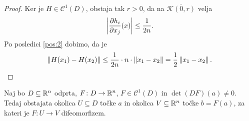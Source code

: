 \begin{proof}
Ker je $H \in \mathcal{C}^1(D)$, obstaja tak $r > 0$, da na
$\overline{\mathcal{K}(0,r)}$ velja
\[
\left\lvert \frac{\partial h_i}{\partial x_j}(x)\right\rvert \leq \frac{1}{2n}.
\]
Po posledici \ref{pos:2} dobimo, da je
\[
\left\lVert H(x_1) - H(x_2)\right\rVert \leq
\frac{1}{2n} \cdot n \cdot \left\lVert x_1 - x_2\right\rVert =
\frac{1}{2} \left\lVert x_1 - x_2\right\rVert. \qedhere
\]
\end{proof}

\begin{izrek}
\label{iz:inv}
Naj bo $D \subseteq \mathbb{R}^n$ odprta, $F \colon D \to \mathbb{R}^n$,
$F \in \mathcal{C}^1(D)$ in $\det(DF)(a) \ne 0$. Tedaj obstajata
okolica $U \subseteq D$ točke $a$ in okolica $V \subseteq \mathbb{R}^n$
točke $b=F(a)$, za kateri je $F \colon U \to V$ difeomorfizem.
\end{izrek}

